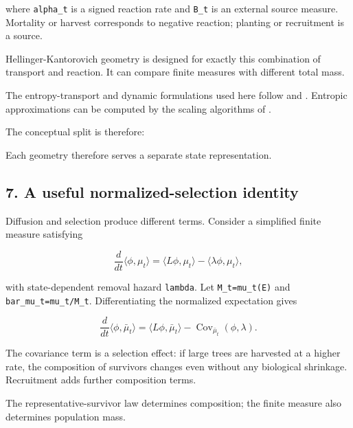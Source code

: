 where \texttt{alpha\_t} is a signed reaction rate and \texttt{B\_t} is an external source
measure. Mortality or harvest corresponds to negative reaction; planting or
recruitment is a source.

Hellinger-Kantorovich geometry is designed for exactly this combination of
transport and reaction. It can compare finite measures with different total
mass.

The entropy-transport and dynamic formulations used here follow
\citet{liero2018entropy} and \citet{chizat2018dynamic}. Entropic approximations
can be computed by the scaling algorithms of \citet{chizat2016scaling}.

The conceptual split is therefore:

\begin{Shaded}
\begin{Highlighting}[]
\end{Highlighting}
\end{Shaded}

Each geometry therefore serves a separate state representation.

\subsection{7. A useful normalized-selection identity}\label{a-useful-normalized-selection-identity}

Diffusion and selection produce different terms. Consider a simplified finite
measure satisfying

\[
\frac{d}{dt}\langle\phi,\mu_t\rangle
=\langle L\phi,\mu_t\rangle-\langle\lambda\phi,\mu_t\rangle,
\]

with state-dependent removal hazard \texttt{lambda}. Let \texttt{M\_t=mu\_t(E)} and
\texttt{bar\_mu\_t=mu\_t/M\_t}. Differentiating the normalized expectation gives

\[
\frac{d}{dt}\langle\phi,\bar\mu_t\rangle
=\langle L\phi,\bar\mu_t\rangle
-\operatorname{Cov}_{\bar\mu_t}(\phi,\lambda).
\]

The covariance term is a selection effect: if large trees are harvested at a
higher rate, the composition of survivors changes even without any biological
shrinkage. Recruitment adds further composition terms.

The representative-survivor law determines composition; the finite measure also
determines population mass.

